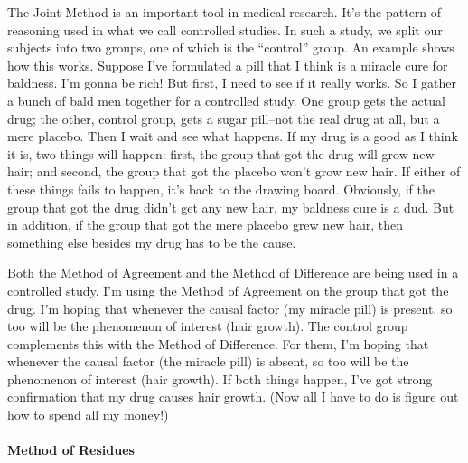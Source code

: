 The Joint Method is an important tool in medical research. It's the pattern of reasoning used in
what we call controlled studies. In such a study, we split our subjects into two groups, one of which
is the ``control'' group. An example shows how this works. Suppose I've formulated a pill that I
think is a miracle cure for baldness. I'm gonna be rich! But first, I need to see if it really works.
So I gather a bunch of bald men together for a controlled study. One group gets the actual drug;
the other, control group, gets a sugar pill--not the real drug at all, but a mere placebo. Then I wait
and see what happens. If my drug is a good as I think it is, two things will happen: first, the group
that got the drug will grow new hair; and second, the group that got the placebo won't grow new
hair. If either of these things fails to happen, it's back to the drawing board. Obviously, if the group
that got the drug didn't get any new hair, my baldness cure is a dud. But in addition, if the group
that got the mere placebo grew new hair, then something else besides my drug has to be the cause.

Both the Method of Agreement and the Method of Difference are being used in a controlled study.
I'm using the Method of Agreement on the group that got the drug. I'm hoping that whenever the
causal factor (my miracle pill) is present, so too will be the phenomenon of interest (hair growth).
The control group complements this with the Method of Difference. For them, I'm hoping that
whenever the causal factor (the miracle pill) is absent, so too will be the phenomenon of interest
(hair growth). If both things happen, I've got strong confirmation that my drug causes hair growth.
(Now all I have to do is figure out how to spend all my money!)

\paragraph{Method of Residues}

